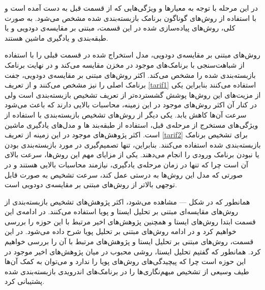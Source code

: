در این مرحله با توجه به معیار‌ها و ویژگی‌هایی که از قسمت قبل به دست آمده است و با استفاده از روش‌های گوناگون برنامک بازبسته‌بندی شده مشخص می‌شود. به صورت کلی، روش‌های پیاده‌سازی شده در این قسمت، مبتنی بر مقایسه‌ی دودویی و یا طبقه‌بندی و یادگیری ماشین هستند.

 روش‌های مبتنی بر مقایسه‌ی دودویی، مدل استخراج شده در قسمت قبلی را با استفاده از شباهت‌سنجی با برنامک‌های موجود در مخزن مقایسه می‌کند و در نهایت برنامک بازبسته‌بندی شده را مشخص می‌کند. اکثر روش‌های مبتنی بر مقایسه‌ی دودویی، جفت برنامک اصلی را نیز مشخص می‌کنند و از تعریف 
\ref{tarif1}
استفاده می‌کنند بنابراین یکی از مزیت‌های این روش‌ها پوشش گشسترده‌تر از تعریف تشخیص بازبسته‌بندی است ولی در کنار آن اکثر روش‌های موجود در این زمینه، محاسبات بالایی دارند که باعث می‌شود سرعت آن‌ها کاهش یابد.
 یکی دیگر از روش‌های تشخیص بازبسته‌بندی با استفاده از ویژگی‌های مستخرج از مرحله‌ی قبل، استفاده از طبقه‌بند ها و مدل‌های یادگیری ماشین است. اکثر پژوهش‌های موجود در این زمینه از تعریف 
\ref{tarif2}
برای تشخیص برنامک بازبسته‌بندی شده استفاده می‌کنند. بنابراین، تنها تصمیم‌گیری در مورد بازبسته‌بندی بودن یا نبودن برنامک ورودی را انجام می‌دهند. یکی از مزایای مهم این رو‌ش‌ها، سرعت بالای آن است چرا که تنها در زمان مرحله‌ی یادگیری، نیازمند محاسبات بالایی هستند و در صورتی که مدل این روش‌ها به درستی عمل کند، سرعت تشخیص به صورت قابل توجهی بالاتر از روش‌های مبتنی بر مقایسه‌ی دودویی است.

همانطور که در شکل --- مشاهده می‌شود، اکثر پژوهش‌های تشخیص بازبسته‌بندی از روش‌های مقایسه‌ای مبتنی بر تحلیل ایستا و پویا استفاده می‌کنند. در ادامه‌ی این قسمت ابتدا روش‌های ایستا و همچنین پژوهش‌های اخیر مرتبط با این حوزه را بررسی خواهیم کرد و در ادامه روش‌های مبتنی بر تحلیل پویا شرح داده می‌شود.
در این قسمت‌، روش‌های مبتنی بر تحلیل ایستا و پژوهش‌های مرتبط با آن را بررسی خواهیم کرد. همانطور که گفتیم تحلیل ایستا، روشی محبوب در میان پژوهش‌های اخیر موجود در این حوزه است چرا که پیچیدگی‌های روش‌های پویا را ندارد و می‌توان به کمک آن‌ها طیف وسیعی از تشخیص مبهم‌نگاری‌ها را در برنامک‌های اندرویدی بازبسته‌بندی شده پشتیبانی کرد.

